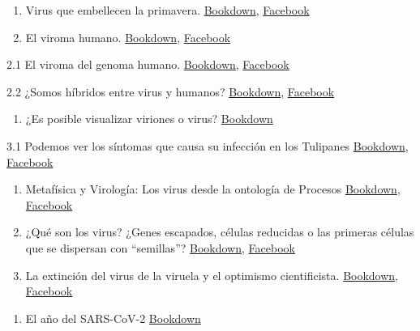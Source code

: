 \documentclass[
  12pt, krantz2,
  spanish,
]{krantz}
\providecommand{\tightlist}{%
  \setlength{\itemsep}{0pt}\setlength{\parskip}{0pt}}
\begin{document}
\begin{enumerate}
\def\labelenumi{\arabic{enumi}.}
\item
  Virus que embellecen la primavera. \protect\hyperlink{vircolor}{Bookdown}, \href{https://www.facebook.com/BioViral/posts/166521528808498}{Facebook}
\item
  El viroma humano. \protect\hyperlink{viroma}{Bookdown}, \href{}{Facebook}
\end{enumerate}

2.1 El viroma del genoma humano. \protect\hyperlink{viroma_genoma}{Bookdown}, \href{https://www.facebook.com/permalink.php?story_fbid=108452037546286\&id=107088044349352}{Facebook}

2.2 ¿Somos híbridos entre virus y humanos? \protect\hyperlink{hybrids}{Bookdown}, \href{https://www.facebook.com/BioViral/posts/152069863586998}{Facebook}

\begin{enumerate}
\def\labelenumi{\arabic{enumi}.}
\setcounter{enumi}{2}
\tightlist
\item
  ¿Es posible visualizar viriones o virus? \protect\hyperlink{viralSigns}{Bookdown}
\end{enumerate}

3.1 Podemos ver los síntomas que causa su infección en los Tulipanes \protect\hyperlink{tulipomania}{Bookdown}, \href{https://www.facebook.com/permalink.php?story_fbid=116167563441400\&id=107088044349352}{Facebook}

\begin{enumerate}
\def\labelenumi{\arabic{enumi}.}
\setcounter{enumi}{3}
\item
  Metafísica y Virología: Los virus desde la ontología de Procesos \protect\hyperlink{metafisica}{Bookdown}, \href{https://www.facebook.com/permalink.php?story_fbid=137306747994148\&id=107088044349352}{Facebook}
\item
  ¿Qué son los virus? ¿Genes escapados, células reducidas o las primeras células que se dispersan con ``semillas''? \protect\hyperlink{WhatVirusAre}{Bookdown}, \href{https://www.facebook.com/permalink.php?story_fbid=145223737202449\&id=107088044349352}{Facebook}
\item
  La extinción del virus de la viruela y el optimismo cientificista. \protect\hyperlink{viruela}{Bookdown}, \href{https://www.facebook.com/permalink.php?story_fbid=148436860214470\&id=107088044349352}{Facebook}
\end{enumerate}

\begin{enumerate}
\def\labelenumi{\arabic{enumi}.}
\setcounter{enumi}{6}
\tightlist
\item
  El año del SARS-CoV-2 \protect\hyperlink{sarscov2}{Bookdown}
\end{enumerate}
\end{document}
